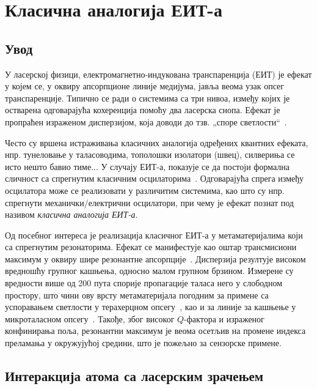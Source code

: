 \documentclass[main.tex]{subfiles}
\begin{document}
\chapter{Класична аналогија ЕИТ-а}%
\label{cha:klasik_eit}

\section{Увод}%
\label{sec:uvod}

У ласерској физици, електромагнетно-индукована транспаренција (ЕИТ) је ефекат у којем се, у оквиру апсорпционе линије медијума, јавља веома узак опсег транспаренције. Типично се ради о системима са три нивоа, између којих је остварена одговарајућа кохеренција помоћу два ласерска снопа. Ефекат је пропраћен израженом дисперзијом, која доводи до тзв. „споре светлости``~\cite{harris1990nonlinear}.

Често су вршена истраживања класичних аналогија одређених квантних ефеката, нпр. тунеловање у таласоводима, тополошки изолатори (швец), силвериња се исто нешто бавио тиме... %
У случају ЕИТ-а, показује се да постоји формална сличност са спрегнутим класичним осцилаторима~\cite{garrido2002classical}. Одговарајућа спрега између осцилатора може се реализовати у различитим системима, као што су нпр. спрегнути механички/електрични осцилатори, при чему је ефекат познат под називом \emph{класична аналогија ЕИТ-а}.%

Од посебног интереса је реализација класичног ЕИТ-а у метаматеријалима који са спрегнутим резонаторима. Ефекат се манифестује као оштар трансмисиони максимум у оквиру шире резонантне апсорпције~\cite{tassin:09,cihan,mr05}. Дисперзија резултује високом вредношћу групног кашњења, односно малом групном брзином. Измерене су вредности више од 200 пута спорије пропагације таласа него у слободном простору, што чини ову врсту метаматеријала погодним за примене са успоравањем светлости у терахерцном опсегу~\cite{tassin:09}, као и за линије за кашњење у микроталасном опсегу~\cite{mr05}. Такође, због високог $Q$-фактора и израженог конфинирања поља, резонантни максимум је веома осетљив на промене индекса преламања у окружујућој средини, што је пожељно за сензорске примене.

\section{Интеракција атома са ласерским зрачењем}
\end{document}
